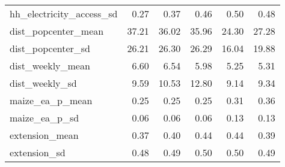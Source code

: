 \begin{table}[ht]
\begin{tabular}{lrrrrr}
  hh_electricity_access_sd & 0.27 & 0.37 & 0.46 & 0.50 & 0.48 \\ 
  dist_popcenter_mean & 37.21 & 36.02 & 35.96 & 24.30 & 27.28 \\ 
  dist_popcenter_sd & 26.21 & 26.30 & 26.29 & 16.04 & 19.88 \\ 
  dist_weekly_mean & 6.60 & 6.54 & 5.98 & 5.25 & 5.31 \\ 
  dist_weekly_sd & 9.59 & 10.53 & 12.80 & 9.14 & 9.34 \\ 
  maize_ea_p_mean & 0.25 & 0.25 & 0.25 & 0.31 & 0.36 \\ 
  maize_ea_p_sd & 0.06 & 0.06 & 0.06 & 0.13 & 0.13 \\ 
  extension_mean & 0.37 & 0.40 & 0.44 & 0.44 & 0.39 \\ 
  extension_sd & 0.48 & 0.49 & 0.50 & 0.50 & 0.49 \\ 
   \hline
\end{tabular}
\end{table}
